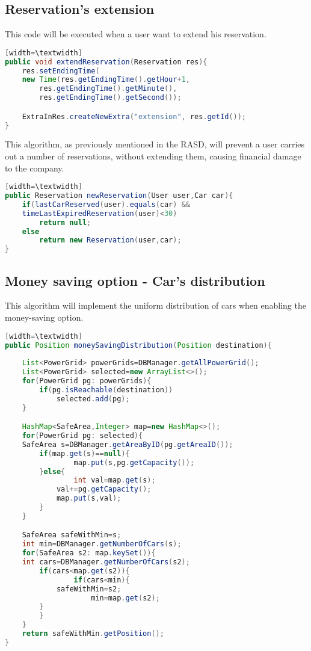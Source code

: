 \documentclass[10pt, a4paper,titlepage]{article}
\begin{document}
\subsection*{Reservation's extension}
This code will be executed when a user want to extend his reservation.
\begin{lstlisting}[language=Java][width=\textwidth]
public void extendReservation(Reservation res){
    res.setEndingTime(
	new Time(res.getEndingTime().getHour+1,
		res.getEndingTime().getMinute(),
		res.getEndingTime().getSecond());

    ExtraInRes.createNewExtra("extension", res.getId());
}
\end{lstlisting}
\bigskip
\bigskip
This algorithm, as previously mentioned in the RASD, will prevent a user carries out a number of reservations, without extending them, causing financial damage to the company.
\begin{lstlisting}[language=Java][width=\textwidth]
public Reservation newReservation(User user,Car car){
    if(lastCarReserved(user).equals(car) && 
	timeLastExpiredReservation(user)<30)
        return null;
    else
        return new Reservation(user,car);
}
\end{lstlisting}
\subsection*{Money saving option - Car's distribution}
This algorithm will implement the uniform distribution of cars when enabling the money-saving option.
\begin{lstlisting}[language=Java][width=\textwidth]
public Position moneySavingDistribution(Position destination){
    
    List<PowerGrid> powerGrids=DBManager.getAllPowerGrid();
    List<PowerGrid> selected=new ArrayList<>();
    for(PowerGrid pg: powerGrids){
        if(pg.isReachable(destination))
            selected.add(pg);
    }

    HashMap<SafeArea,Integer> map=new HashMap<>();
    for(PowerGrid pg: selected){
	SafeArea s=DBManager.getAreaByID(pg.getAreaID());
		if(map.get(s)==null){
    			map.put(s,pg.getCapacity());
		}else{
    			int val=map.get(s);
			val+=pg.getCapacity();
			map.put(s,val);
		}
    }

    SafeArea safeWithMin=s;
    int min=DBManager.getNumberOfCars(s);
    for(SafeArea s2: map.keySet()){
	int cars=DBManager.getNumberOfCars(s2);
    	if(cars<map.get(s2)){
        		if(cars<min){
			safeWithMin=s2;
        			min=map.get(s2);
		}
    	}
    }
    return safeWithMin.getPosition();
}
\end{lstlisting}
\end{document}
